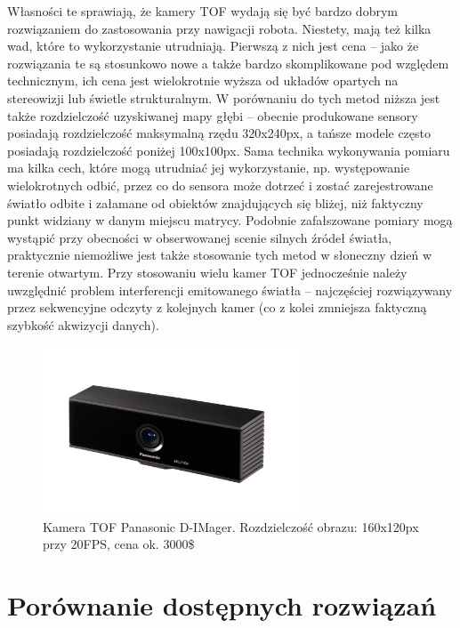 Własności te sprawiają, że kamery TOF wydają się być bardzo dobrym rozwiązaniem
do zastosowania przy nawigacji robota. Niestety, mają też kilka wad, które to
wykorzystanie utrudniają. Pierwszą z nich jest cena -- jako że rozwiązania te są
stosunkowo nowe a także bardzo skomplikowane pod względem technicznym, ich cena
jest wielokrotnie wyższa od układów opartych na stereowizji lub świetle
strukturalnym. W porównaniu do tych metod niższa jest także rozdzielczość
uzyskiwanej mapy głębi -- obecnie produkowane sensory posiadają rozdzielczość
maksymalną rzędu 320x240px, a tańsze modele często posiadają rozdzielczość
poniżej 100x100px. Sama technika wykonywania pomiaru ma kilka cech, które mogą
utrudniać jej wykorzystanie, np. występowanie wielokrotnych odbić, przez co
do sensora może dotrzeć i zostać zarejestrowane światło odbite i załamane od
obiektów znajdujących się bliżej, niż faktyczny punkt widziany w danym miejscu
matrycy. Podobnie zafałszowane pomiary mogą wystąpić przy obecności w
obserwowanej scenie silnych źródeł światła, praktycznie niemożliwe jest także
stosowanie tych metod w słoneczny dzień w terenie otwartym. Przy stosowaniu
wielu kamer TOF jednocześnie należy uwzględnić problem interferencji emitowanego
światła -- najczęściej rozwiązywany przez sekwencyjne odczyty z kolejnych kamer
(co z kolei zmniejsza faktyczną szybkość akwizycji danych).

\begin{figure}[h!]
\centering
\includegraphics[height=5cm]{../../Common/img/dimager}
\caption[Kamera TOF Panasonic D-IMager]{Kamera TOF Panasonic D-IMager.
Rozdzielczość obrazu: 160x120px przy 20FPS, cena ok. 3000\$}
\label{fig:dimager}
\end{figure}

\section{Porównanie dostępnych rozwiązań}

